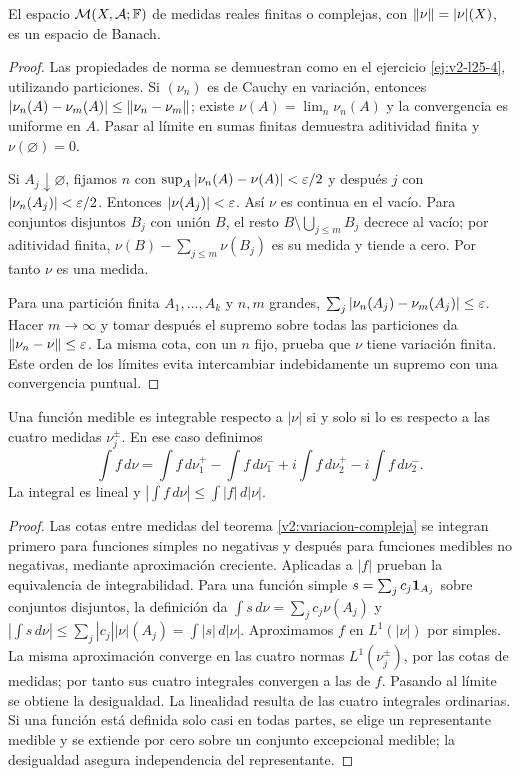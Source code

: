 \begin{teorema}\label{v2:medidas-banach}
El espacio $\mathcal M(X,\mathcal A;\mathbb F)$ de medidas reales finitas o complejas, con $\left\lVert\nu\right\rVert=|\nu|(X)$, es un espacio de Banach.
\end{teorema}
\begin{proof}
Las propiedades de norma se demuestran como en el ejercicio \ref{ej:v2-l25-4}, utilizando particiones. Si $(\nu_n)$ es de Cauchy en variación, entonces $|\nu_n(A)-\nu_m(A)|\le\left\lVert\nu_n-\nu_m\right\rVert$; existe $\nu(A)=\lim_n\nu_n(A)$ y la convergencia es uniforme en $A$. Pasar al límite en sumas finitas demuestra aditividad finita y $\nu(\varnothing)=0$.

Si $A_j\downarrow\varnothing$, fijamos $n$ con $\sup_A|\nu_n(A)-\nu(A)|<\varepsilon/2$ y después $j$ con $|\nu_n(A_j)|<\varepsilon/2$. Entonces $|\nu(A_j)|<\varepsilon$. Así $\nu$ es continua en el vacío. Para conjuntos disjuntos $B_j$ con unión $B$, el resto $B\setminus\bigcup_{j\le m}B_j$ decrece al vacío; por aditividad finita, $\nu(B)-\sum_{j\le m}\nu(B_j)$ es su medida y tiende a cero. Por tanto $\nu$ es una medida.

Para una partición finita $A_1,\ldots,A_k$ y $n,m$ grandes, $\sum_j|\nu_n(A_j)-\nu_m(A_j)|\le\varepsilon$. Hacer $m\to\infty$ y tomar después el supremo sobre todas las particiones da $\left\lVert\nu_n-\nu\right\rVert\le\varepsilon$. La misma cota, con un $n$ fijo, prueba que $\nu$ tiene variación finita. Este orden de los límites evita intercambiar indebidamente un supremo con una convergencia puntual.
\end{proof}
\begin{proposicion}\label{v2:integral-compleja}
Una función medible es integrable respecto a $|\nu|$ si y solo si lo es respecto a las cuatro medidas $\nu_j^\pm$. En ese caso definimos
\[
 \int f\,d\nu=\int f\,d\nu_1^+-\int f\,d\nu_1^-+
 i\int f\,d\nu_2^+-i\int f\,d\nu_2^-.
\]
La integral es lineal y $|\int f\,d\nu|\le\int|f|\,d|\nu|$.
\end{proposicion}
\begin{proof}
Las cotas entre medidas del teorema \ref{v2:variacion-compleja} se integran primero para funciones simples no negativas y después para funciones medibles no negativas, mediante aproximación creciente. Aplicadas a $|f|$ prueban la equivalencia de integrabilidad. Para una función simple $s=\sum_jc_j\mathbf1_{A_j}$ sobre conjuntos disjuntos, la definición da $\int s\,d\nu=\sum_jc_j\nu(A_j)$ y
$|\int s\,d\nu|\le\sum_j|c_j||\nu|(A_j)=\int|s|\,d|\nu|$.
Aproximamos $f$ en $L^1(|\nu|)$ por simples. La misma aproximación converge en las cuatro normas $L^1(\nu_j^\pm)$, por las cotas de medidas; por tanto sus cuatro integrales convergen a las de $f$. Pasando al límite se obtiene la desigualdad. La linealidad resulta de las cuatro integrales ordinarias. Si una función está definida solo casi en todas partes, se elige un representante medible y se extiende por cero sobre un conjunto excepcional medible; la desigualdad asegura independencia del representante.
\end{proof}

